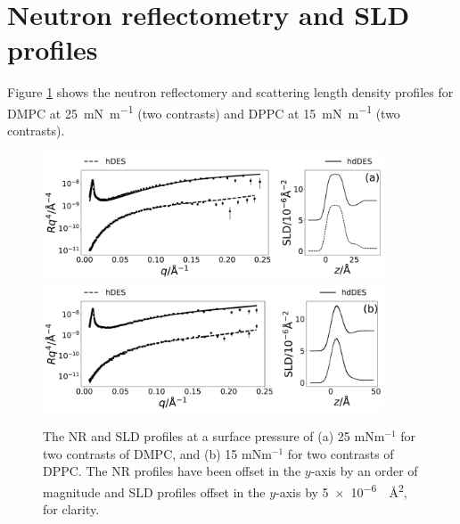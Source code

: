 \documentclass[11pt,a4paper]{article}
\begin{document}
\section{Neutron reflectometry and SLD profiles}
Figure \ref{fig:neutron} shows the neutron reflectomery and scattering length density profiles for DMPC at \SI{25}{\milli\newton\per\meter} (two contrasts) and DPPC at \SI{15}{\milli\newton\per\meter} (two contrasts).
%
\begin{figure}
	\centering
	\includegraphics[width=0.9\textwidth]{figures/dmpc_25n_ref_sld}
	\includegraphics[width=0.9\textwidth]{figures/dppc_15n_ref_sld}
	\caption{The NR and SLD profiles at a surface pressure of (a) 25 mNm$^{-1}$ for two contrasts of DMPC, and (b) 15 mNm$^{-1}$ for two contrasts of DPPC. The NR profiles have been offset in the $y$-axis by an order of magnitude and SLD profiles offset in the $y$-axis by \SI{5e-6}{\per\square\angstrom}, for clarity.}
	\label{fig:neutron}
\end{figure}
%
\end{document}
